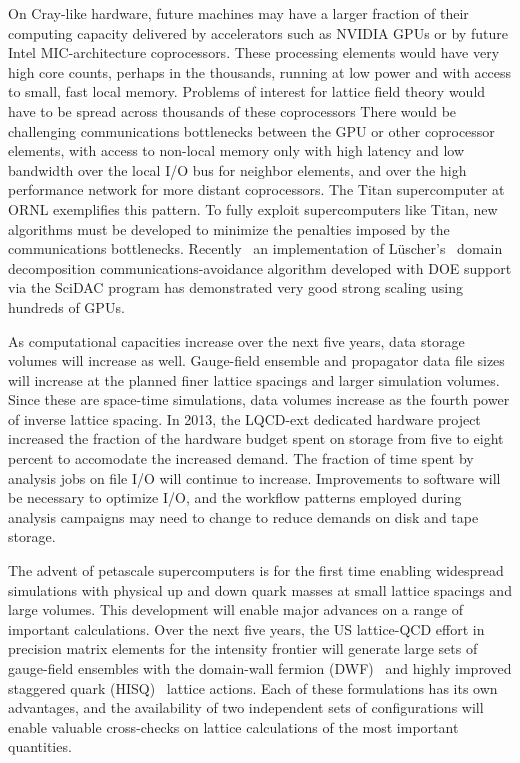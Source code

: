 On Cray-like hardware, future machines may have a larger fraction of their
computing capacity delivered by accelerators such as NVIDIA GPUs or by
future Intel MIC-architecture coprocessors.  These processing elements would
have very high core counts, perhaps in the thousands, running at low power and
with access to small, fast local memory.  Problems of interest for lattice
field theory would have to be spread across thousands of these coprocessors
There would be challenging communications bottlenecks between the GPU or
other coprocessor elements, with access to non-local memory only with high
latency and low bandwidth over the local I/O bus for neighbor elements, and
over the high performance network for more distant coprocessors.  The Titan
supercomputer at ORNL exemplifies this pattern.  To fully exploit
supercomputers like Titan, new algorithms must be developed to minimize the
penalties imposed by the communications bottlenecks.  Recently~\cite{QUDAdd}
an implementation of L\"{u}scher's~\cite{DomainDecomp} domain decomposition
communications-avoidance algorithm developed with DOE support via the SciDAC
program has demonstrated very good strong scaling using hundreds of GPUs.

As computational capacities increase over the next five years, data storage
volumes will increase as well.  Gauge-field ensemble and propagator data file
sizes will increase at the planned finer lattice spacings and larger
simulation volumes.  Since these are space-time simulations, data volumes
increase as the fourth power of inverse lattice spacing.  In 2013, the
LQCD-ext dedicated hardware project increased the fraction of the hardware
budget spent on storage from five to eight percent to accomodate the increased
demand.  The fraction of time spent by analysis jobs on file I/O will continue
to increase.  Improvements to software will be necessary to optimize I/O, and
the workflow patterns employed during analysis campaigns may need to change to
reduce demands on disk and tape storage.


The advent of petascale supercomputers is for the first time enabling
widespread simulations with physical up and down quark masses at small lattice
spacings and large volumes.  This development will enable major advances on a
range of important calculations.  Over the next five years, the US lattice-QCD
effort in precision matrix elements for the intensity frontier will generate
large sets of gauge-field ensembles with the domain-wall fermion
(DWF)~\cite{Kaplan:1992bt,Furman:1994ky,Vranas:2006zk} and highly improved
staggered quark (HISQ)~\cite{Follana:2006rc} lattice actions. Each of these
formulations has its own advantages, and the availability of two independent
sets of configurations will enable valuable cross-checks on lattice
calculations of the most important quantities.

